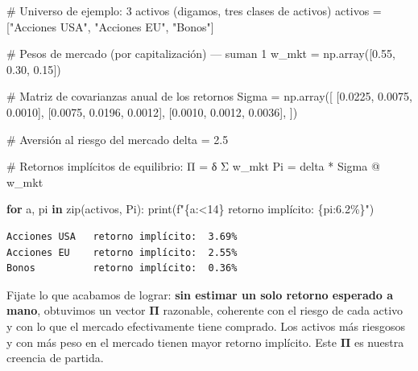 \documentclass[
  spanish,
  letterpaper,
  DIV=11,
  numbers=noendperiod]{scrreprt}
\newenvironment{Shaded}{\begin{snugshade}}{\end{snugshade}}
\newcommand{\BuiltInTok}[1]{\textcolor[rgb]{0.00,0.23,0.31}{#1}}
\newcommand{\CommentTok}[1]{\textcolor[rgb]{0.37,0.37,0.37}{#1}}
\newcommand{\ControlFlowTok}[1]{\textcolor[rgb]{0.00,0.23,0.31}{\textbf{#1}}}
\newcommand{\FloatTok}[1]{\textcolor[rgb]{0.68,0.00,0.00}{#1}}
\newcommand{\KeywordTok}[1]{\textcolor[rgb]{0.00,0.23,0.31}{\textbf{#1}}}
\newcommand{\NormalTok}[1]{\textcolor[rgb]{0.00,0.23,0.31}{#1}}
\newcommand{\OperatorTok}[1]{\textcolor[rgb]{0.37,0.37,0.37}{#1}}
\newcommand{\SpecialCharTok}[1]{\textcolor[rgb]{0.37,0.37,0.37}{#1}}
\newcommand{\SpecialStringTok}[1]{\textcolor[rgb]{0.13,0.47,0.30}{#1}}
\newcommand{\StringTok}[1]{\textcolor[rgb]{0.13,0.47,0.30}{#1}}
\begin{document}
\label{equilibrio}
\begin{Shaded}
\begin{Highlighting}[]
\CommentTok{\# Universo de ejemplo: 3 activos (digamos, tres clases de activos)}
\NormalTok{activos }\OperatorTok{=}\NormalTok{ [}\StringTok{"Acciones USA"}\NormalTok{, }\StringTok{"Acciones EU"}\NormalTok{, }\StringTok{"Bonos"}\NormalTok{]}

\CommentTok{\# Pesos de mercado (por capitalización) — suman 1}
\NormalTok{w\_mkt }\OperatorTok{=}\NormalTok{ np.array([}\FloatTok{0.55}\NormalTok{, }\FloatTok{0.30}\NormalTok{, }\FloatTok{0.15}\NormalTok{])}

\CommentTok{\# Matriz de covarianzas anual de los retornos}
\NormalTok{Sigma }\OperatorTok{=}\NormalTok{ np.array([}
\NormalTok{    [}\FloatTok{0.0225}\NormalTok{, }\FloatTok{0.0075}\NormalTok{, }\FloatTok{0.0010}\NormalTok{],}
\NormalTok{    [}\FloatTok{0.0075}\NormalTok{, }\FloatTok{0.0196}\NormalTok{, }\FloatTok{0.0012}\NormalTok{],}
\NormalTok{    [}\FloatTok{0.0010}\NormalTok{, }\FloatTok{0.0012}\NormalTok{, }\FloatTok{0.0036}\NormalTok{],}
\NormalTok{])}

\CommentTok{\# Aversión al riesgo del mercado}
\NormalTok{delta }\OperatorTok{=} \FloatTok{2.5}

\CommentTok{\# Retornos implícitos de equilibrio: Π = δ Σ w\_mkt}
\NormalTok{Pi }\OperatorTok{=}\NormalTok{ delta }\OperatorTok{*}\NormalTok{ Sigma }\OperatorTok{@}\NormalTok{ w\_mkt}

\ControlFlowTok{for}\NormalTok{ a, pi }\KeywordTok{in} \BuiltInTok{zip}\NormalTok{(activos, Pi):}
    \BuiltInTok{print}\NormalTok{(}\SpecialStringTok{f"}\SpecialCharTok{\{}\NormalTok{a}\SpecialCharTok{:\textless{}14\}}\SpecialStringTok{ retorno implícito: }\SpecialCharTok{\{}\NormalTok{pi}\SpecialCharTok{:6.2\%\}}\SpecialStringTok{"}\NormalTok{)}
\end{Highlighting}
\end{Shaded}

\begin{verbatim}
Acciones USA   retorno implícito:  3.69%
Acciones EU    retorno implícito:  2.55%
Bonos          retorno implícito:  0.36%
\end{verbatim}

Fijate lo que acabamos de lograr: \textbf{sin estimar un solo retorno
esperado a mano}, obtuvimos un vector \(\boldsymbol{\Pi}\) razonable,
coherente con el riesgo de cada activo y con lo que el mercado
efectivamente tiene comprado. Los activos más riesgosos y con más peso
en el mercado tienen mayor retorno implícito. Este \(\boldsymbol{\Pi}\)
es nuestra creencia de partida.
\end{document}
